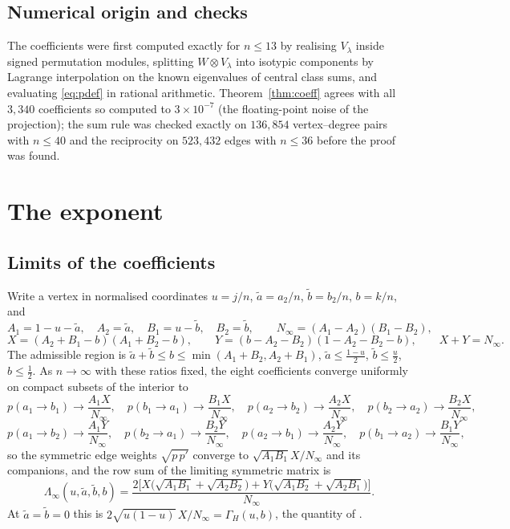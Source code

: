 \documentclass[11pt]{amsart}
\theoremstyle{definition}
\begin{document}
\subsection{Numerical origin and checks}\label{sec:numerics}
The coefficients were first computed exactly for $n\le13$ by realising $V_\lambda$ inside signed permutation modules, splitting $W\otimes V_\lambda$ into isotypic components by Lagrange interpolation on the known eigenvalues of central class sums, and evaluating \eqref{eq:pdef} in rational arithmetic. Theorem~\ref{thm:coeff} agrees with all $3{,}340$ coefficients so computed to $3\times10^{-7}$ (the floating-point noise of the projection); the sum rule was checked exactly on $136{,}854$ vertex--degree pairs with $n\le40$ and the reciprocity on $523{,}432$ edges with $n\le36$ before the proof was found.

\section{The exponent}\label{sec:exponent}

\subsection{Limits of the coefficients}
Write a vertex in normalised coordinates $u=j/n$, $\tilde a=a_2/n$, $\tilde b=b_2/n$, $b=k/n$, and
\[
A_1=1-u-\tilde a,\quad A_2=\tilde a,\quad B_1=u-\tilde b,\quad B_2=\tilde b,\qquad N_\infty=(A_1-A_2)(B_1-B_2),
\]
\[
X=(A_2+B_1-b)(A_1+B_2-b),\qquad Y=(b-A_2-B_2)(1-A_2-B_2-b),\qquad X+Y=N_\infty .
\]
The admissible region is $\tilde a+\tilde b\le b\le\min(A_1+B_2,A_2+B_1)$, $\tilde a\le\frac{1-u}2$, $\tilde b\le\frac u2$, $b\le\frac12$. As $n\to\infty$ with these ratios fixed, the eight coefficients converge uniformly on compact subsets of the interior to
\[
p(a_1\to b_1)\to\frac{A_1X}{N_\infty},\quad p(b_1\to a_1)\to\frac{B_1X}{N_\infty},\quad p(a_2\to b_2)\to\frac{A_2X}{N_\infty},\quad p(b_2\to a_2)\to\frac{B_2X}{N_\infty},
\]
\[
p(a_1\to b_2)\to\frac{A_1Y}{N_\infty},\quad p(b_2\to a_1)\to\frac{B_2Y}{N_\infty},\quad p(a_2\to b_1)\to\frac{A_2Y}{N_\infty},\quad p(b_1\to a_2)\to\frac{B_1Y}{N_\infty},
\]
so the symmetric edge weights $\sqrt{p\,p'}$ converge to $\sqrt{A_1B_1}X/N_\infty$ and its companions, and the row sum of the limiting symmetric matrix is
\begin{equation}\label{eq:Lambda}
\Lambda_\infty(u,\tilde a,\tilde b,b)=\frac{2\big[X\big(\sqrt{A_1B_1}+\sqrt{A_2B_2}\big)+Y\big(\sqrt{A_1B_2}+\sqrt{A_2B_1}\big)\big]}{N_\infty}.
\end{equation}
At $\tilde a=\tilde b=0$ this is $2\sqrt{u(1-u)}\,X/N_\infty=\Gamma_H(u,b)$, the quantity of \cite[\S2]{OAI2026}.
\end{document}
